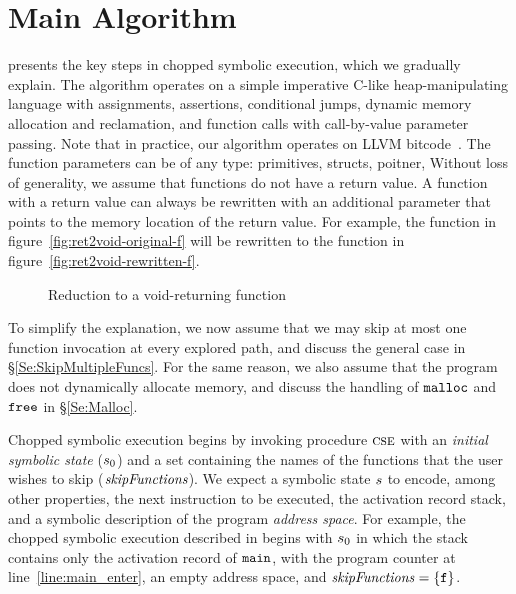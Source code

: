 
\section{Main Algorithm}\label{section:main-algorithm}

 presents the key steps in chopped
symbolic execution, which we gradually explain. The algorithm operates
on a simple imperative C-like heap-manipulating language with
assignments, assertions, conditional jumps, dynamic memory allocation
and reclamation, and function calls with call-by-value parameter
passing.
Note that in practice, our algorithm operates on LLVM bitcode~\cite{llvm}.
The function parameters can be of any type: primitives, structs, poitner, \etc
Without loss of generality, we assume that functions do not have a return value.
A function with a return value can always be rewritten with an additional parameter 
that points to the memory location of the return value.
For example, the function in figure~\ref{fig:ret2void-original-f}
will be rewritten to the function in figure~\ref{fig:ret2void-rewritten-f}.
\begin{figure*}[t]
  \centering
  \subfloat[]{
    
    \label{fig:ret2void-original-f}
  }
  
  \subfloat[]{
    
    \label{fig:ret2void-rewritten-f}
  }

  \caption{Reduction to a void-returning function}
  \label{fig:simple}
\end{figure*}

To simplify the explanation, we now
assume that we may skip at most one function invocation at every
explored path, and discuss the general case in
\S\ref{Se:SkipMultipleFuncs}. For the same reason, we also assume that
the program does not dynamically allocate memory, and discuss the
handling of $\texttt{malloc}$ and $\texttt{free}$ in \S\ref{Se:Malloc}.

Chopped symbolic execution begins by invoking procedure $\textsc{cse}$
with an \emph{initial symbolic state} ($s_0$) and a set
containing the names of the functions that the user wishes to skip
($\mathit{skipFunctions}$). We expect a symbolic state $s$ to encode,
among other properties, the next instruction to be executed, the activation record stack,
and a symbolic description of the program \emph{address space}. For example, the
chopped symbolic execution described in  begins
with $s_0$ in which the stack contains only the activation record
of $\texttt{main}$, with the program counter at
line~\ref{line:main_enter}, an empty address space, and
$\mathit{skipFunctions} = \{ \texttt{f} \}$.

